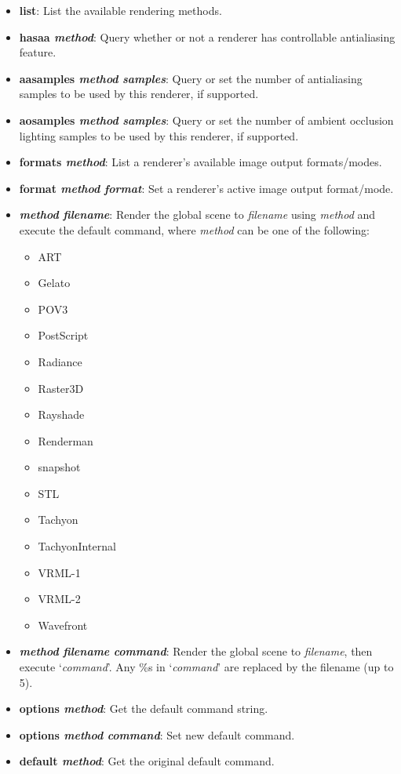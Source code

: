   \begin{itemize}
    \item {\bf list}: List the available rendering methods.
    \item {\bf hasaa {\it method}}: 
         Query whether or not a renderer has controllable antialiasing feature.
    \item {\bf aasamples {\it method} {\it samples}}: 
         Query or set the number of antialiasing samples to be used by this
         renderer, if supported.
    \item {\bf aosamples {\it method} {\it samples}}: 
         Query or set the number of ambient occlusion lighting
         samples to be used by this renderer, if supported.
    \item {\bf formats {\it method}}:
         List a renderer's available image output formats/modes.
    \item {\bf format {\it method} {\it format}}:
         Set a renderer's active image output format/mode.
         
    \item {\bf  {\it method} {\it filename}}: Render the global 
	scene to {\it filename} using {\it method} and execute the 
	default command, where {\it method} can be one of the following:
	\begin{itemize}
		\item ART
                \item Gelato
		\item POV3
		\item PostScript
		\item Radiance
		\item Raster3D
		\item Rayshade
                \item Renderman
		\item snapshot
		\item STL
		\item Tachyon 
		\item TachyonInternal 
		\item VRML-1
		\item VRML-2
                \item Wavefront
	\end{itemize} 
    \item {\bf  {\it method} {\it filename} {\it command}}: Render the global scene to 
{\it filename}, then execute `{\it command}'.  Any \%s in `{\it command}'
are replaced by the filename (up to 5).
    \item {\bf  {\bf options} {\it method}}: Get the default command string.
    \item {\bf  {\bf options} {\it method} {\it command}}: Set new default command.
    \item {\bf  {\bf default} {\it method}}: Get the original default command. 
  \end{itemize}


